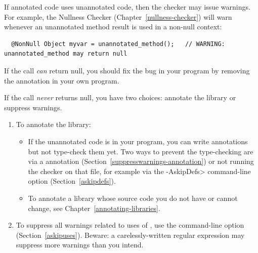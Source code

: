 If annotated code uses unannotated code, then the checker may issue
warnings.  For example, the Nullness Checker (Chapter~\ref{nullness-checker}) will
warn whenever an unannotated method result is used in a non-null context:

\begin{Verbatim}
  @NonNull Object myvar = unannotated_method();   // WARNING: unannotated_method may return null
\end{Verbatim}

If the call \emph{can} return null, you should fix the bug in your program by
removing the  annotation in your own program.

If the call \emph{never} returns null, you have two choices:  annotate the library
or suppress warnings.
\begin{enumerate}
\item To annotate the library:
  \begin{itemize}
  \item
    If the unannotated code is in your program, you can write annotations
    but not type-check them yet.  Two ways to prevent the type-checking are
    via a  annotation
    (Section~\ref{suppresswarnings-annotation}) or not running the
    checker on that file, for example via the \<-AskipDefs> command-line
    option (Section~\ref{askipdefs}).
  \item
    To annotate a library whose source code you do not have or cannot
    change, see Chapter~\ref{annotating-libraries}.
  \end{itemize}
\item To suppress all warnings related to uses of
  , use the  command-line option
  (Section~\ref{askipuses}).  Beware:  a carelessly-written regular
  expression may suppress more warnings than you intend.
\end{enumerate}


